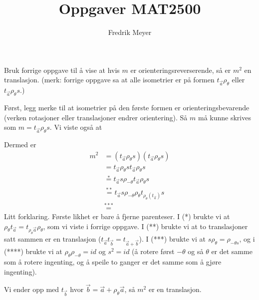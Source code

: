 \documentclass[11pt, norsk]{article}
\begin{document}
\title{Oppgaver MAT2500}
\author{Fredrik Meyer}
\maketitle 

\begin{oppg}
Bruk forrige oppgave til å vise at hvis $m$ er orienteringsreverserende, så er $m^2$ en translasjon. (merk: forrige oppgave sa at alle isometrier er på formen $t_{\vec a} \rho_\theta$ eller $t_{\vec a} \rho_\theta s$.)
\end{oppg}
\begin{losn}
Først, legg merke til at isometrier på den første formen er orienteringsbevarende (verken rotasjoner eller translasjoner endrer orientering). Så $m$ må kunne skrives som $m=t_{\vec a} \rho_\theta s$. Vi viste også at 

Dermed er
\begin{align*}
m^2 &= (t_{\vec a} \rho_\theta s)(t_{\vec a} \rho_\theta s) \\
&= t_{\vec a} \rho_\theta s t_{\vec a} \rho_\theta s \\
&\stackrel{*}{=} t_{\vec a} s \rho_{-\theta} t_{\vec a} \rho_\theta s \\
&\stackrel{**}{=} t_{\vec a} s \rho_{-\theta} \rho_{\theta}t_{\rho_\theta(t_{\vec a})} s \\
&\stackrel{***}{=} 
\end{align*}
Litt forklaring. Første likhet er bare å fjerne parenteser. I (*) brukte vi at $\rho_\theta t_{\vec a} = t_{\rho_\theta \vec a}\rho_\theta$, som vi viste i forrige oppgave. I (**) brukte vi at to translasjoner satt sammen er en translasjon ($t_{\vec a}t_{\vec b} = t_{\vec a + \vec b}$). I (***) brukte vi at $s\rho_\theta = \rho_{-\theta s}$, og i (****) brukte vi at $\rho_\theta \rho_{-\theta}=id$ og $s^2=id$ (å rotere først $-\theta$ og så $\theta$ er det samme som å rotere ingenting, og å speile to ganger er det samme som å gjøre ingenting). 

Vi ender opp med $t_{\vec b}$ hvor $\vec b=\vec a + \rho_\theta \vec a$, så $m^2$ er en translasjon.
\end{losn}
\end{document}
